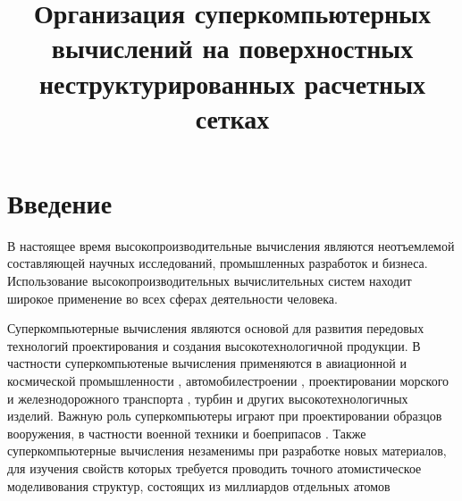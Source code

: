 \documentclass[a4paper,14pt]{extarticle}                     %
\numberwithin{equation}{section}                             %
\numberwithin{figure}{section}                               %
\numberwithin{table}{section}                                %
\theoremstyle{plain}                                         %
\numberwithin{theorem}{section}                              %
\numberwithin{lemma}{section}                                %
\numberwithin{definition}{section}                           %
\begin{document}

\title{Организация суперкомпьютерных вычислений на поверхностных неструктурированных расчетных сетках}
\author{}
\date{}
\maketitle
\thispagestyle{empty}                                        %

\newpage
\renewcommand{\contentsname}{Оглавление}                     %
\tableofcontents


\newpage
\section*{Введение}                      %

В настоящее время высокопроизводительные вычисления являются неотъемлемой составляющей научных исследований, промышленных разработок и бизнеса.
Использование высокопроизводительных вычислительных систем \cite{GOST57700HPC} находит широкое применение во всех сферах деятельности человека.

Суперкомпьютерные вычисления являются основой для развития передовых технологий проектирования и создания высокотехнологичной продукции.
В частности суперкомпьютеные вычисления применяются в авиационной и космической промышленности \cite{Kornev2021SuperAvio}, автомобилестроении \cite{Wang2020SuperAuto}, проектировании морского и железнодорожного транспорта \cite{Nikitin2018SuperShip,Solovyev2013SuperTrains}, турбин \cite{Duben2022SuperTurbine} и других высокотехнологичных изделий.
Важную роль суперкомпьютеры играют при проектировании образцов вооружения, в частности военной техники и боеприпасов \cite{Ageeva2023SuperMilitary}.
Также суперкомпьютерные вычисления незаменимы при разработке новых материалов, для изучения свойств которых требуется проводить точного атомистическое моделивования структур, состоящих из миллиардов отдельных атомов \cite{Wang2025SuperMolDyn}
\end{document}
